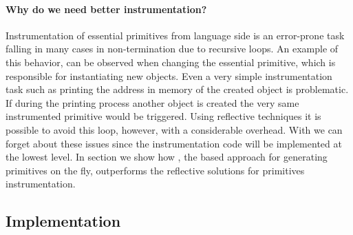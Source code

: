 \paragraph{Why do we need better instrumentation?}
Instrumentation of essential primitives from language side is an error-prone task falling in many cases in non-termination due to recursive loops. 
An example of this behavior, can be observed when changing the essential  primitive, which is responsible for instantiating new objects.
Even a very simple instrumentation task such as printing the address in memory of the created object is problematic.
If during the printing process another object is created the very same instrumented  primitive would be triggered.
Using reflective techniques it is possible to avoid this loop, however, with a considerable overhead.
With \WF we can forget about these issues since the instrumentation code will be implemented at the lowest level.
In section  we show how \WF, the \B based approach for generating primitives on the fly, outperforms the reflective solutions for primitives instrumentation. 


\subsection{Implementation}


